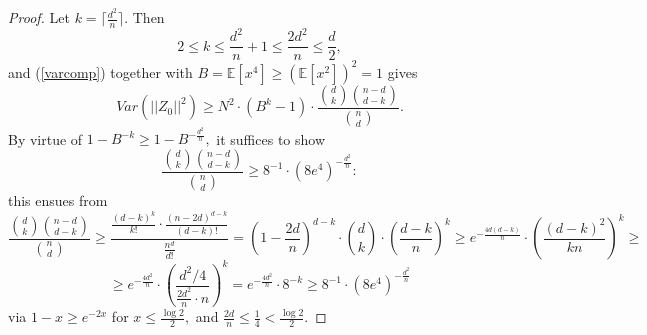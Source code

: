 \documentclass{article}
\numberwithin{equation}{section}
\begin{document}
\begin{proof}
    Let \(k=\lceil \frac{d^2}{n} \rceil.\) Then 
    \[2 \leq k \leq \frac{d^2}{n}+1 \leq \frac{2d^2}{n} \leq \frac{d}{2},\] 
    and (\ref{varcomp}) together with \(B=\mathbb{E}[x^4] \geq (\mathbb{E}[x^2])^2=1\) gives
    \[Var(||Z_0||^2) \geq N^2 \cdot (B^k-1) \cdot \frac{\binom{d}{k} \binom{n-d}{d-k}}{\binom{n}{d}}.\]
    By virtue of \(1-B^{-k} \geq 1-B^{-\frac{d^2}{n}},\) it suffices to show
    \[\frac{\binom{d}{k} \binom{n-d}{d-k}}{\binom{n}{d}} \geq 8^{-1} \cdot (8e^4)^{-\frac{d^2}{n}}:\]
    this ensues from
    \[\frac{\binom{d}{k} \binom{n-d}{d-k}}{\binom{n}{d}} \geq \frac{\frac{(d-k)^k}{k!} \cdot \frac{(n-2d)^{d-k}}{(d-k)!}}{\frac{n^d}{d!}}=(1-\frac{2d}{n})^{d-k} \cdot \binom{d}{k} \cdot (\frac{d-k}{n})^{k} \geq e^{-\frac{4d(d-k)}{n}} \cdot (\frac{(d-k)^2}{kn})^k \geq\]
    \[\geq e^{-\frac{4d^2}{n}} \cdot (\frac{d^2/4}{\frac{2d^2}{n} \cdot n})^k= e^{-\frac{4d^2}{n}} \cdot 8^{-k} \geq 8^{-1} \cdot (8e^4)^{-\frac{d^2}{n}}\]
    via \(1-x \geq e^{-2x}\) for \(x \leq \frac{\log{2}}{2},\) and \(\frac{2d}{n} \leq \frac{1}{4}< \frac{\log{2}}{2}.\)
\end{proof}
\end{document}
